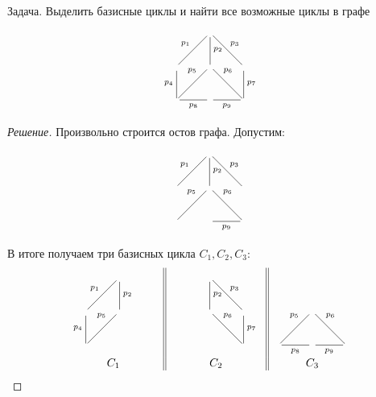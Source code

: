 \begin{exampl}
    Задача. Выделить базисные циклы и найти все возможные циклы в графе
    \[
        {\xymatrix{
            *{} 
                &{} \ar@{-}[dl]_{p_1} \ar@{-}[d]^{p_2} \ar@{-}[dr]^{p_3}
                    &*{}
                        \\
            {} \ar@{-}[d]_{p_4} 
                &{} \ar@{-}[dl]_(.3){p_5} \ar@{-}[dr]^(.3){p_6} 
                    &{} \ar@{-}[d]^{p_7} 
                        \\
            {} \ar@{-}[r]_{p_8} 
                &{} \ar@{-}[r]_{p_9} 
                    &{}
        }}
    \]
\end{exampl}
\begin{proof}[Решение]
    Произвольно строится остов графа. Допустим:
    \[
        {\xymatrix{
            *{} 
                &{} \ar@{-}[dl]_{p_1} \ar@{-}[d]^{p_2} \ar@{-}[dr]^{p_3}
                    &*{}
                        \\
            {} 
                &{} \ar@{-}[dl]_(.3){p_5} \ar@{-}[dr]^(.3){p_6} 
                    &{} 
                        \\
            {} 
                &{} \ar@{-}[r]_{p_9} 
                    &{}
        }}
    \]
    
    В итоге получаем три базисных цикла $C_1, C_2, C_3$:
    \[
        \begin{tabular}{c||c||c}
            {\xymatrix{
                *{} 
                    &{} \ar@{-}[dl]_{p_1} \ar@{-}[d]^{p_2}
                        &*{}
                            \\
                {} \ar@{-}[d]_{p_4} 
                    &{} \ar@{-}[dl]_(.3){p_5}
                        &{}
                            \\
                {} 
                    &{} 
                        &{}
            }}
            &
                {\xymatrix{
                    *{} 
                        &{} \ar@{-}[d]^{p_2} \ar@{-}[dr]^{p_3}
                            &*{}
                                \\
                    {} 
                        &{} \ar@{-}[dr]^(.3){p_6} 
                            &{} \ar@{-}[d]^{p_7} 
                                \\
                    {} 
                        &{}
                            &{}
                }}
                &
                    {\xymatrix{
                        *{} 
                            &{}
                                &*{}
                                    \\
                        {} 
                            &{} \ar@{-}[dl]_(.3){p_5} \ar@{-}[dr]^(.3){p_6} 
                                &{} 
                                    \\
                        {} \ar@{-}[r]_{p_8} 
                            &{} \ar@{-}[r]_{p_9} 
                                &{}
                    }}
                        \\
            $C_1$&$C_2$&$C_3$
        \end{tabular}
    \]
    

\end{proof}
